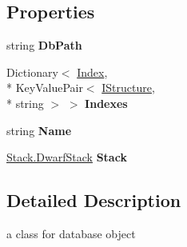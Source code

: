 \subsection*{Properties}
\begin{DoxyCompactItemize}
\item 
\hypertarget{class_dwarf_d_b_1_1_data_structures_1_1_data_base_a6d2cec1036e84cf7bd32e14cb57fb2c9}{string {\bfseries Db\+Path}}\label{class_dwarf_d_b_1_1_data_structures_1_1_data_base_a6d2cec1036e84cf7bd32e14cb57fb2c9}

\item 
\hypertarget{class_dwarf_d_b_1_1_data_structures_1_1_data_base_a17e9d903646d5709103eabea2113c974}{Dictionary$<$ \hyperlink{class_dwarf_d_b_1_1_data_structures_1_1_index}{Index}, \\*
Key\+Value\+Pair$<$ \hyperlink{interface_dwarf_d_b_1_1_data_structures_1_1_i_structure}{I\+Structure}, \\*
string $>$ $>$ {\bfseries Indexes}}\label{class_dwarf_d_b_1_1_data_structures_1_1_data_base_a17e9d903646d5709103eabea2113c974}

\item 
\hypertarget{class_dwarf_d_b_1_1_data_structures_1_1_data_base_ab8b85389f822faa790eaf18a7fe35cce}{string {\bfseries Name}}\label{class_dwarf_d_b_1_1_data_structures_1_1_data_base_ab8b85389f822faa790eaf18a7fe35cce}

\item 
\hypertarget{class_dwarf_d_b_1_1_data_structures_1_1_data_base_a2ca4a32633cc1324190d6f37da17cc8b}{\hyperlink{class_dwarf_d_b_1_1_stack_1_1_dwarf_stack}{Stack.\+Dwarf\+Stack} {\bfseries Stack}}\label{class_dwarf_d_b_1_1_data_structures_1_1_data_base_a2ca4a32633cc1324190d6f37da17cc8b}

\end{DoxyCompactItemize}


\subsection{Detailed Description}
a class for database object 



